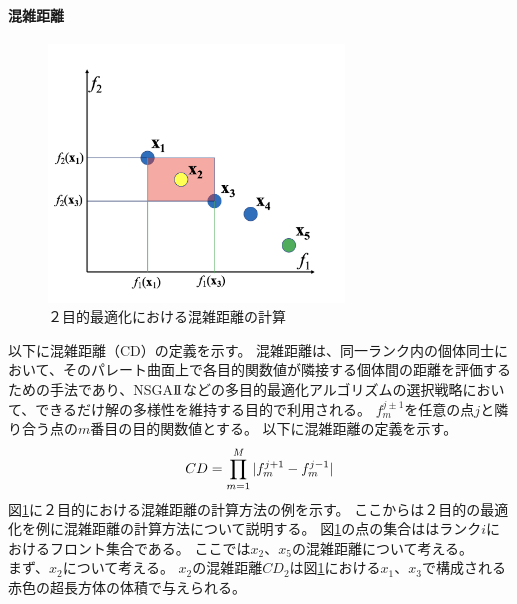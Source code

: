 \documentclass[10pt, a4paper, titlepage]{jarticle}
\begin{document}
\paragraph{混雑距離}
\begin{figure}[h]
\begin{center}
\includegraphics[width=0.7\textwidth]{cd.png}
\end{center}
\label{CD}
\caption{２目的最適化における混雑距離の計算}
\end{figure}
以下に混雑距離（CD）の定義を示す。
混雑距離は、同一ランク内の個体同士において、そのパレート曲面上で各目的関数値が隣接する個体間の距離を評価するための手法であり、NSGA$\mathrm{I}\hspace{-1.2pt}\mathrm{I}$などの多目的最適化アルゴリズムの選択戦略において、できるだけ解の多様性を維持する目的で利用される。
$f_{m}^{j\pm{1}}$を任意の点$j$と隣り合う点の$m$番目の目的関数値とする。
以下に混雑距離の定義を示す。
\begin{equation}
CD=\prod_{m=1}^{{\it M}}|f_{m}^{j+1}-f_{m}^{j-1}|
\end{equation}
図\ref{CD}に２目的における混雑距離の計算方法の例を示す。
ここからは２目的の最適化を例に混雑距離の計算方法について説明する。
図\ref{CD}の点の集合ははランク$i$におけるフロント集合である。
ここでは$x_2$、$x_5$の混雑距離について考える。\\
まず、$x_2$について考える。
$x_2$の混雑距離$CD_2$は図\ref{CD}における$x_1$、$x_3$で構成される赤色の超長方体の体積で与えられる。
\end{document}
